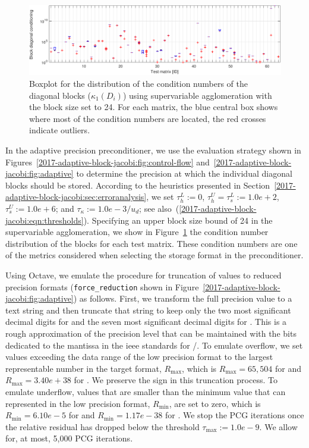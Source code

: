 \begin{figure}
\begin{center}
\includegraphics[width=\textwidth]{plots/boxplot_log_cond}
\caption{Boxplot for the distribution of the condition numbers 
         of the diagonal blocks ($\kappa_1(D_i)$) using supervariable 
         agglomeration with the block size set to 24. For each matrix, the blue 
         central box shows where most of the condition numbers are located, the 
         red crosses indicate outliers.}
\label{2017-adaptive-block-jacobi:fig:blockcondnums}
\end{center}
\end{figure}

In the adaptive precision preconditioner, we use the evaluation strategy shown
in Figures~\ref{2017-adaptive-block-jacobi:fig:control-flow} and~\ref{2017-adaptive-block-jacobi:fig:adaptive} to determine
the precision at which the individual diagonal blocks should be stored. 
According to the heuristics presented in Section~\ref{2017-adaptive-block-jacobi:sec:erroranalysis}, we set
$\tau_h^L:= 0$, 
$\tau_h^U = \tau_s^L:=1.0e+2$, 
$\tau_s^U := 1.0e+6$; 
and $\tau_{\kappa}:=1.0e-3 /u_d$; see
also~(\ref{2017-adaptive-block-jacobi:eqn:thresholds}). Specifying an upper block size bound of 24 in the
supervariable agglomeration, we show in Figure~\ref{2017-adaptive-block-jacobi:fig:blockcondnums} the 
condition number distribution of the blocks for each test
matrix. These condition numbers are one of the metrics considered when 
selecting the storage format in the \apbj preconditioner.

Using Octave, we emulate the procedure for truncation of \fpd values to reduced 
precision
formats ({\tt \small force\_reduction} shown in Figure~\ref{2017-adaptive-block-jacobi:fig:adaptive})
as follows. First, we transform the full precision value to a text
string and then truncate that string to keep only the two most significant 
decimal digits for \fph and the seven most significant decimal digits for \fps.
This is a rough approximation of the precision level that can be maintained 
with the bits dedicated to the mantissa in the {\sc ieee} standards for 
\fph/\fps. 
To emulate overflow, we set values
exceeding the data range of the low precision format to the largest
representable number in the target format, $R_{\max}$, which is 
$R_{\max}=65,504$ for \fph 
and $R_{\max}=3.40e+38$ for \fps. We preserve the sign in this truncation
process. To emulate underflow, values  that are smaller than the
minimum value that can represented in the low precision format, $R_{\min}$, 
are set to zero, which is $R_{\min}=6.10e-5$ for \fph and $R_{\min}=1.17e-38$ 
for \fps.
We stop the PCG iterations once the relative residual has dropped below the
threshold $\tau_{\max}:=1.0e-9$. We allow for, at most, 5,000 PCG iterations.

